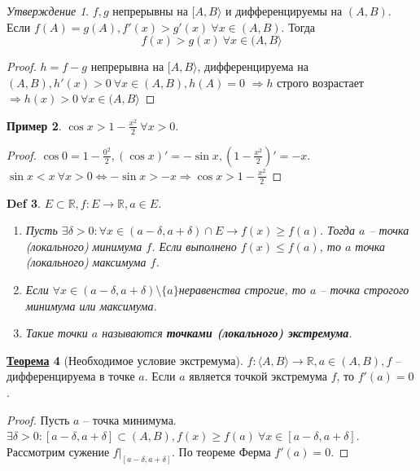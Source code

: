 \documentclass[12pt]{article}
\newenvironment{MyList}[1][4pt]{
  \begin{enumerate}[1.]
  \setlength{\parskip}{0pt}
  \setlength{\itemsep}{#1}
}{       
  \end{enumerate}
}
\def\R{\mathbb{R}}       %
\def\SO{\Rightarrow}     %
\def\EQ{\Leftrightarrow} %
\theoremstyle{definition} %
\newtheorem{Thm}{\underline{Теорема}}[subsection] %
\newtheorem{Example}[Thm]{Пример} %
\theoremstyle{plain} %
\newtheorem{Def}[Thm]{Def} %
\theoremstyle{remark} %
\newtheorem{Prop}[Thm]{Утверждение} %
\begin{document}
\begin{Prop}
    $f, g$ непрерывны на $[A, B\rangle$ и дифференцируемы на $(A, B)$. 
    Если $f(A) = g(A), f'(x) > g'(x) \ \forall x \in (A, B)$. Тогда
    \[f(x) > g(x) \ \forall x \in (A, B\rangle\]
\end{Prop}

\begin{proof}
    $h = f - g$ непрерывна на $[A, B\rangle$, дифференцируема на $(A, B), h'(x) > 0 \ \forall x \in (A, B), h(A) = 0$
    $\SO h$ строго возрастает $\SO h(x) > 0 \ \forall x \in (A, B\rangle$   
\end{proof}

\begin{Example}
    $\cos x > 1 - \frac{x^2}{2} \ \forall x > 0$.
\end{Example}

\begin{proof}
    $\cos 0 = 1 - \frac{0^2}{2}, (\cos x)' = -\sin x, (1 - \frac{x^2}{2})' = -x$.
    $\sin x < x \ \forall x > 0 \EQ -\sin x > -x \SO \cos x > 1 - \frac{x^2}{2}$   
\end{proof}

\begin{Def}
    $E \subset \R, f : E \to \R, a \in E$.
    \begin{MyList}
        \item Пусть $\exists \delta > 0 : \forall x \in (a - \delta, a + \delta) \cap E \to f(x) \geqslant f(a)$. Тогда $a$ -- точка (локального) минимума $f$.
        Если выполнено $f(x) \leqslant f(a)$, то $a$ точка (локального) максимума $f$.
        \item Если $\forall x \in (a - \delta, a + \delta) \setminus \{a\}$неравенства строгие, то $a$ -- точка строгого минимума или максимума. 
        \item Такие точки $a$ называются \textbf{точками (локального) экстремума}.
    \end{MyList}
\end{Def}

\begin{Thm}[Необходимое условие экстремума]
    $f : \langle A, B\rangle \to \R, a \in (A, B), f $ -- дифференцируема в точке $a$.
    Если $a$ является точкой экстремума $f$, то $f'(a) = 0$.  
\end{Thm}

\begin{proof}
    Пусть $a$ -- точка минимума. $\exists \delta > 0 : [a - \delta, a + \delta] \subset (A, B), f(x) \geqslant f(a) \ \forall x \in [a - \delta, a + \delta]$.
    Рассмотрим сужение $f|_{[a - \delta, a + \delta]}$. По теореме Ферма $f'(a) = 0$.  
\end{proof}
\end{document}
